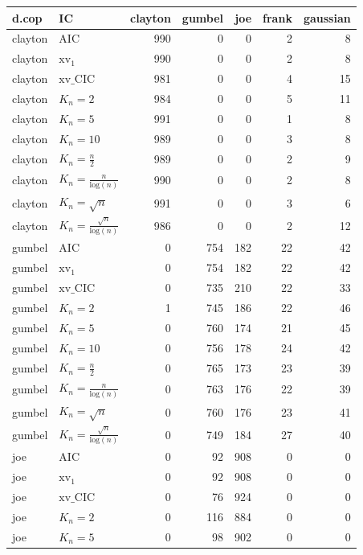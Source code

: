 \begin{table}[htbp]
\centering
\begin{tabular}{llrrrrr}
  \hline
d.cop & IC & clayton & gumbel & joe & frank & gaussian \\ 
  \hline
clayton & AIC & 990 & 0 & 0 & 2 & 8 \\ 
  clayton & $\text{xv}_{1}$ & 990 & 0 & 0 & 2 & 8 \\ 
  clayton & $\text{xv}\_\text{CIC}$ & 981 & 0 & 0 & 4 & 15 \\ 
  clayton & $K_{n}=2$ & 984 & 0 & 0 & 5 & 11 \\ 
  clayton & $K_{n}=5$ & 991 & 0 & 0 & 1 & 8 \\ 
  clayton & $K_{n}=10$ & 989 & 0 & 0 & 3 & 8 \\ 
  clayton & $K_{n}=\tfrac{n}{2}$ & 989 & 0 & 0 & 2 & 9 \\ 
  clayton & $K_{n}=\tfrac{n}{\text{log}(n)}$ & 990 & 0 & 0 & 2 & 8 \\ 
  clayton & $K_{n}=\sqrt{n}$ & 991 & 0 & 0 & 3 & 6 \\ 
  clayton & $K_{n}=\tfrac{\sqrt{n}}{\text{log}(n)}$ & 986 & 0 & 0 & 2 & 12 \\ 
   \hdashline
gumbel & AIC & 0 & 754 & 182 & 22 & 42 \\ 
  gumbel & $\text{xv}_{1}$ & 0 & 754 & 182 & 22 & 42 \\ 
  gumbel & $\text{xv}\_\text{CIC}$ & 0 & 735 & 210 & 22 & 33 \\ 
  gumbel & $K_{n}=2$ & 1 & 745 & 186 & 22 & 46 \\ 
  gumbel & $K_{n}=5$ & 0 & 760 & 174 & 21 & 45 \\ 
  gumbel & $K_{n}=10$ & 0 & 756 & 178 & 24 & 42 \\ 
  gumbel & $K_{n}=\tfrac{n}{2}$ & 0 & 765 & 173 & 23 & 39 \\ 
  gumbel & $K_{n}=\tfrac{n}{\text{log}(n)}$ & 0 & 763 & 176 & 22 & 39 \\ 
  gumbel & $K_{n}=\sqrt{n}$ & 0 & 760 & 176 & 23 & 41 \\ 
  gumbel & $K_{n}=\tfrac{\sqrt{n}}{\text{log}(n)}$ & 0 & 749 & 184 & 27 & 40 \\ 
   \hdashline
joe & AIC & 0 & 92 & 908 & 0 & 0 \\ 
  joe & $\text{xv}_{1}$ & 0 & 92 & 908 & 0 & 0 \\ 
  joe & $\text{xv}\_\text{CIC}$ & 0 & 76 & 924 & 0 & 0 \\ 
  joe & $K_{n}=2$ & 0 & 116 & 884 & 0 & 0 \\ 
  joe & $K_{n}=5$ & 0 & 98 & 902 & 0 & 0 \\ 

\end{tabular}
\end{table}

